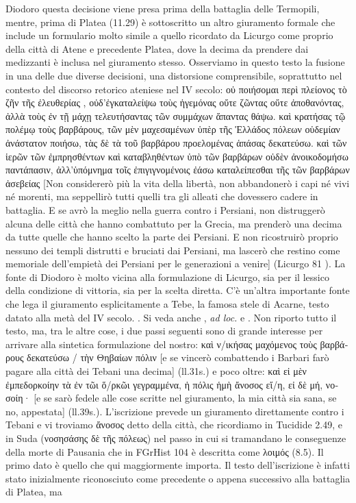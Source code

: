 {Diodoro questa decisione viene presa prima della battaglia delle Termopili, mentre, prima di Platea (11.29) è sottoscritto un altro giuramento formale che include un formulario molto simile a quello ricordato da Licurgo  come proprio della città di Atene e  precedente Platea, dove la decima da prendere dai medizzanti è inclusa nel giuramento stesso. Osserviamo in questo testo la fusione in una delle due diverse decisioni, una distorsione comprensibile, soprattutto nel contesto del discorso retorico ateniese nel IV secolo: \textgreek{οὐ ποιήσομαι περὶ πλείονος τὸ ζῆν τῆς ἐλευθερίας , οὐδ’ἐγκαταλείψω τοὺς ἡγεμόνας οὔτε ζῶντας οὔτε ἀποθανόντας, ἀλλὰ τοὺς ἐν τῇ μάχῃ τελευτήσαντας τῶν συμμάχων ἅπαντας θάψω. καὶ κρατήσας τῷ πολέμῳ τοὺς βαρβάρους, τῶν μὲν μαχεσαμένων ὑπὲρ τῆς Ἑλλάδος πόλεων οὑδεμίαν ἀνάστατον ποιήσω, τὰς δὲ τὰ τοῦ βαρβάρου προελομένας ἁπάσας δεκατεύσω. καὶ τῶν ἱερῶν τῶν ἐμπρησθέντων καὶ καταβληθέντων ὑπὸ τῶν βαρβάρων οὐδὲν ἀνοικοδομήσω παντάπασιν, ἀλλ’ὑπόμνημα τοῖς ἐπιγιγνομένοις ἐάσω καταλείπεσθαι τῆς τῶν βαρβάρων ἀσεβείας} [Non considererò più la vita della libertà, non abbandonerò i capi né vivi né morenti, ma seppellirò tutti quelli tra gli alleati che dovessero cadere in battaglia. E se avrò la meglio nella guerra contro i Persiani, non distruggerò alcuna delle città che hanno combattuto per la Grecia, ma prenderò una decima da tutte quelle che hanno scelto la parte dei Persiani. E non ricostruirò proprio nessuno dei templi distrutti e bruciati dai Persiani, ma lascerò che restino come memoriale dell'empietà dei Persiani per le generazioni a venire] (Licurgo 81 \label{bkm:lycleocr81}). La fonte di  Diodoro è molto vicina alla formulazione  di Licurgo, sia per il lessico della condizione di vittoria, sia per la scelta diretta. C'è un'altra importante fonte che lega il giuramento esplicitamente a Tebe, la famosa stele di Acarne, testo datato alla metà del IV secolo. \cite[n° 88]{Rhodes2004}. Si veda anche \cite{Pownall2011}, \emph{ad loc.} e  \cite[731s]{Krentz2007}. Non riporto tutto il testo, ma, tra le altre cose, i due passi seguenti sono di grande interesse per arrivare alla sintetica formulazione del nostro: \textgreek{καὶ ν/ικήσας μαχόμενος τοὺς βαρβάρους δεκατεύσω / τὴν Θηβαίων πόλιν} [e se vincerò combattendo i Barbari farò  pagare alla città dei Tebani una decima]  (ll.31s.) e poco oltre: \textgreek{καὶ εἰ μὲν ἐμπεδορκοίην τὰ ἐν τῶι ὅ/ρκῶι γεγραμμένα, ἡ πόλις ἡμὴ ἄνοσος εἴ/η, εἰ δὲ μή, νοσοίη·} [e se sarò fedele alle cose scritte nel giuramento, la mia città sia sana, se no, appestata] (ll.39s.). L'iscrizione prevede un giuramento direttamente contro i Tebani e vi troviamo \textgreek{ἄνοσος} detto della città, che ricordiamo in Tucidide 2.49, e in Suda (\textgreek{νοσησάσης δὲ τῆς πόλεως}) nel passo in cui si tramandano le conseguenze della morte di Pausania  che in FGrHist 104 è descritta come \textgreek{λοιμός} (8.5). Il primo dato è quello che qui maggiormente importa. Il testo dell'iscrizione è infatti stato inizialmente riconosciuto come precedente o appena successivo alla battaglia di Platea, ma }
